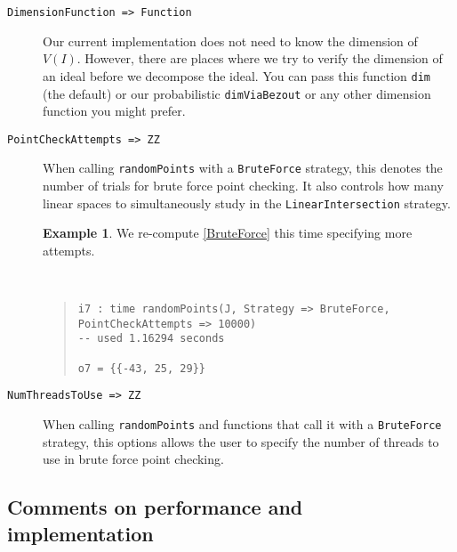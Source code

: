 \documentclass[11pt]{amsart}
\theoremstyle{definition}
\newtheorem{example}{Example}[section]
\begin{document}
\begin{description}
    \item[\tt DimensionFunction => Function]
        Our current implementation does not need to know the dimension of $V(I)$.  However, there are places where we try to verify the dimension of an ideal before we decompose the ideal.  You can pass this function {\tt dim} (the default) or our probabilistic {\tt dimViaBezout} or any other dimension function you might prefer.

    \item[\tt PointCheckAttempts => ZZ] 
    
    
    When calling {\tt randomPoints} with a {\tt BruteForce} strategy, this denotes the number of trials for brute force point checking.  It also controls how many linear spaces to simultaneously study in the {\tt LinearIntersection} strategy.
    
    \begin{example}
        We re-compute \cref{BruteForce} this time specifying more attempts.
    {{\small\color{blue}
    ~~
    \begin{quote}
\begin{verbatim}    
i7 : time randomPoints(J, Strategy => BruteForce, PointCheckAttempts => 10000)
-- used 1.16294 seconds

o7 = {{-43, 25, 29}}
    \end{verbatim}%
\end{quote}\vspace{-1em}%
}}%
    \end{example}%
    
    \item[\tt NumThreadsToUse => ZZ]
When calling  { \tt randomPoints} and functions that call it with a { \tt BruteForce} strategy, this options allows the user to specify the number of threads to use in brute force point checking.
    
    \end{description}

    \subsection{Comments on performance and implementation}
    \label{subsec.CommentOnPerformanceAndImplementation}
\end{document}
